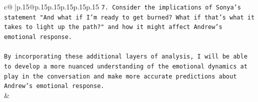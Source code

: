 \documentclass{article}
\begin{document}
{\begin{supertabular}{c@{$\;$}|p{.15\linewidth}@{}p{.15\linewidth}p{.15\linewidth}p{.15\linewidth}p{.15\linewidth}p{.15\linewidth}}
{{{\texttt{7. Consider the implications of Sonya's statement "And what if I'm ready to get burned? What if that's what it takes to light up the path?" and how it might affect Andrew's emotional response.} \\
\\ 
\texttt{By incorporating these additional layers of analysis, I will be able to develop a more nuanced understanding of the emotional dynamics at play in the conversation and make more accurate predictions about Andrew's emotional response.} \\
            }
        }
    }
    & \\ \\

\end{supertabular}
}
\end{document}

